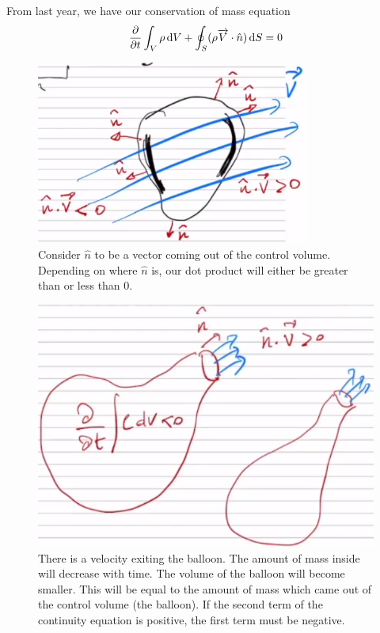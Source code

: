 \documentclass[class=report, crop=false, 12pt,a4paper]{standalone}
\begin{document}
From last year, we have our conservation of mass equation
$$\frac{\partial}{\partial t} \int_V \rho \dif V + \oint_S (\rho \overrightarrow{V} \cdot \hat{n} )\dif S = 0$$
\begin{figure}[H]
  \centering
  \includegraphics[width = 0.8\textwidth]{../img/euleriancontrolvolume.png}
  \caption{Consider $\hat{n}$ to be a vector coming out of the control volume. Depending on where $\hat{n}$ is, our dot product will either be greater than or less than 0.}
\end{figure}
\begin{figure}[H]
  \centering
  \includegraphics[width = 0.8 \textwidth]{../img/balloondeflatingeg.png}
  \caption{There is a velocity exiting the balloon. The amount of mass inside will decrease with time. The volume of the balloon will become smaller. This will be equal to the amount of mass which came out of the control volume (the balloon). If the second term of the continuity equation is positive, the first term must be negative.}
\end{figure}
\end{document}
